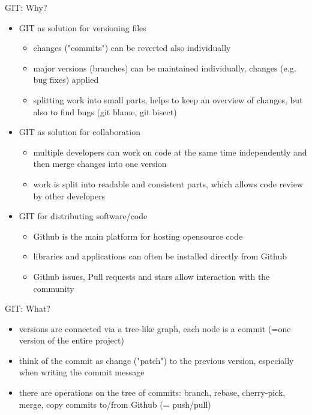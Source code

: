 \begin{frame}[fragile]{GIT: Why?}
    \begin{itemize}
        \item GIT as solution for versioning files\pause
            \begin{itemize}
                \item changes ("commits") can be reverted also individually
                \item major versions (branches) can be maintained individually, changes (e.g. bug
                    fixes) applied
                \item splitting work into small parts, helps to keep an overview of changes, but
                    also to find bugs (git blame, git bisect)
            \end{itemize}
            \pause
        \item GIT as solution for collaboration\pause
            \begin{itemize}
                \item multiple developers can work on code at the same time independently and then
                    merge changes into one version
                \item work is split into readable and consistent parts, which allows code review by
                    other developers
            \end{itemize}
            \pause
        \item GIT for distributing software/code\pause
            \begin{itemize}
                \item Github is the main platform for hosting opensource code
                \item libraries and applications can often be installed directly from Github
                \item Github issues, Pull requests and stars allow interaction with the community
            \end{itemize}
    \end{itemize}
\end{frame}


\begin{frame}[fragile]{GIT: What?}
    \begin{itemize}
        \item versions are connected via a tree-like graph, each node is a commit (=one version of
            the entire project)\pause
        \item think of the commit as change ("patch") to the previous version, especially when
            writing the commit message\pause
        \item there are operations on the tree of commits: branch, rebase, cherry-pick, merge,
            copy commits to/from Github (= push/pull)
    \end{itemize}
\end{frame}


